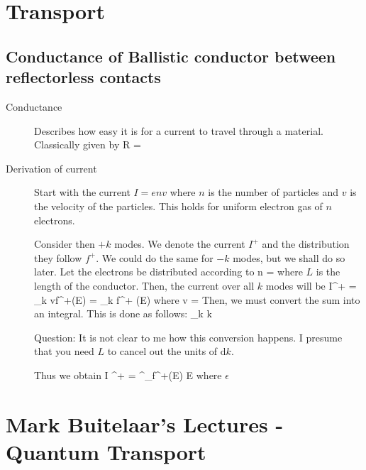 \section{Transport}

\subsection{Conductance of Ballistic conductor between reflectorless contacts}
\begin{description}
\item[Conductance] Describes how easy it is for a current to travel through a material. Classically given by 
\beq
R = \sigma {}
\eeq

\item[Derivation of current] Start with the current $I = env$ where $n$ is the number of particles and $v$ is the velocity of the particles. This holds for uniform electron gas of $n$ electrons. 

Consider then $+k$ modes. We denote the current $I^+$ and the distribution they follow $f^+$. We could do the same for $-k$ modes, but we shall do so later. Let the electrons be distributed according to 
\beq
n = 
\eeq
where $L$ is the length of the conductor. Then, the current over all $k$ modes will be
\beq
I^+ =  \sum_k vf^+(E) =  \sum_k   f^+ (E)
\eeq
where
\beq
v  =  
\eeq
Then, we must convert the sum into an integral. This is done as follows:
\beq
\sum_k  \times {} \int {}k
\eeq

Question: It is not clear to me how this conversion happens. I presume that you need $L$ to cancel out the units of $\mathrm{d} k $. 

Thus we obtain 
\beq
I ^+ =  \int^\infty_\epsilon f^+(E)  E
\eeq
where $\epsilon$

\end{description}

\newpage
\section{Mark Buitelaar's Lectures - Quantum Transport}
